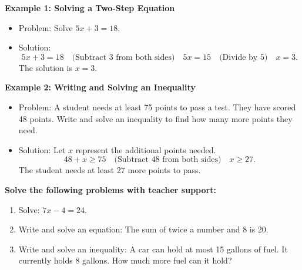 \documentclass[12pt]{article}
\begin{document}
\begin{tcolorbox}[colframe=black!60, colback=white, 
coltitle=black, colbacktitle=black!15, fonttitle=\bfseries\Large, 
title=Examples, halign title=center, left=10pt, right=10pt, top=10pt, bottom=15pt]
\textbf{Example 1: Solving a Two-Step Equation}
\begin{itemize}
    \item Problem: Solve \( 5x + 3 = 18 \).
    \item Solution:
    \[
    5x + 3 = 18 \quad \text{(Subtract 3 from both sides)} \quad 5x = 15 \quad \text{(Divide by 5)} \quad x = 3.
    \]
    The solution is \( x = 3 \).
\end{itemize}

\textbf{Example 2: Writing and Solving an Inequality}
\begin{itemize}
    \item Problem: A student needs at least 75 points to pass a test. They have scored 48 points. Write and solve an inequality to find how many more points they need.
    \item Solution:
    Let \( x \) represent the additional points needed.
    \[
    48 + x \geq 75 \quad \text{(Subtract 48 from both sides)} \quad x \geq 27.
    \]
    The student needs at least 27 more points to pass.
\end{itemize}
\end{tcolorbox}

\vspace{1em}

\begin{tcolorbox}[colframe=black!60, colback=white, 
coltitle=black, colbacktitle=black!15, fonttitle=\bfseries\Large, 
title=Guided Practice, halign title=center, left=10pt, right=10pt, top=10pt, bottom=15pt]
\textbf{Solve the following problems with teacher support:}
\begin{enumerate}[itemsep=3em]
    \item Solve: \( 7x - 4 = 24 \).
    \item Write and solve an equation: The sum of twice a number and 8 is 20.
    \item Write and solve an inequality: A car can hold at most 15 gallons of fuel. It currently holds 8 gallons. How much more fuel can it hold?
\end{enumerate}
\end{tcolorbox}

\vspace{1em}
\end{document}
